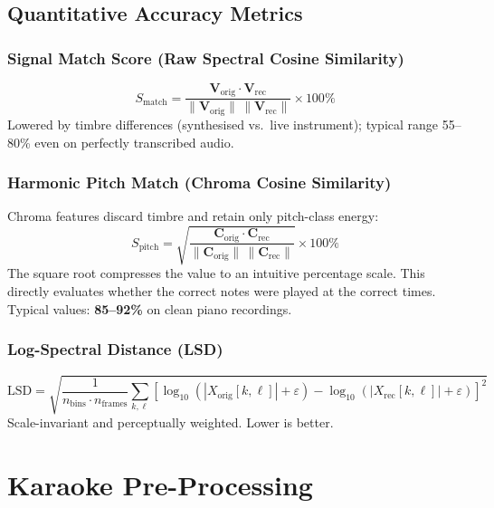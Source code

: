 \documentclass[12pt, a4paper]{article}
\begin{document}
\subsection{Quantitative Accuracy Metrics}

\subsubsection{Signal Match Score (Raw Spectral Cosine Similarity)}

\begin{equation}
  S_{\text{match}} =
  \frac{\mathbf{V}_{\text{orig}}\cdot\mathbf{V}_{\text{rec}}}
       {\|\mathbf{V}_{\text{orig}}\|\,\|\mathbf{V}_{\text{rec}}\|}\times100\%
\end{equation}
Lowered by timbre differences (synthesised vs.\ live instrument); typical
range 55--80\% even on perfectly transcribed audio.

\subsubsection{Harmonic Pitch Match (Chroma Cosine Similarity)}

Chroma features discard timbre and retain only pitch-class energy:
\begin{equation}
  S_{\text{pitch}} =
  \sqrt{\frac{\mathbf{C}_{\text{orig}}\cdot\mathbf{C}_{\text{rec}}}
             {\|\mathbf{C}_{\text{orig}}\|\,\|\mathbf{C}_{\text{rec}}\|}}\times100\%
\end{equation}
The square root compresses the value to an intuitive percentage scale.
This directly evaluates whether the correct notes were played at the correct
times. Typical values: \textbf{85--92\%} on clean piano recordings.

\subsubsection{Log-Spectral Distance (LSD)}

\begin{equation}
  \text{LSD} =
  \sqrt{\frac{1}{n_{\text{bins}}\cdot n_{\text{frames}}}
  \sum_{k,\ell}
  \!\left[\log_{10}(|X_{\text{orig}}[k,\ell]|+\varepsilon)
         -\log_{10}(|X_{\text{rec}}[k,\ell]|+\varepsilon)\right]^2}
\end{equation}
Scale-invariant and perceptually weighted. Lower is better.

\section{Karaoke Pre-Processing}
\end{document}
